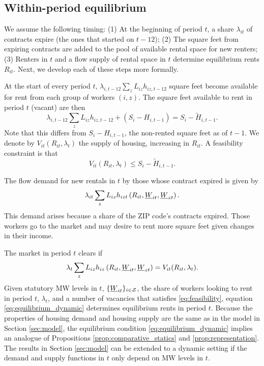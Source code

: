 \subsection*{Within-period equilibrium}

We assume the following timing: 
(1) At the beginning of period $t$, a share $\lambda_{it}$ of contracts 
expire (the ones that started on $t-12$);
(2) The square feet from expiring contracts are added to the pool of available 
rental space for new renters;
(3) Renters in $t$ and a flow supply of rental space in $t$ determine equilibrium 
rents $R_{it}$.
Next, we develop each of these steps more formally.

At the start of every period $t$, $\lambda_{i,t-12} \sum_z L_{iz} h_{iz,t-12}$ 
square feet become available for rent from each group of workers $(i,z)$.
The square feet available to rent in period $t$ (vacant) are then
$$
\lambda_{i,t-12} \sum_z L_{iz} h_{iz,t-12} + (S_i - H_{i,t-1}) 
       = S_i - \tilde H_{i,t-1}.
$$
Note that this differs from $S_i - H_{i,t-1}$, the non-rented square feet as 
of $t-1$.
We denote by $V_{it}(R_{it}, \lambda_t)$ the supply of housing, increasing in 
$R_{it}$.
A feasibility constraint is that 
\begin{equation}\label{eq:feasibility}
    V_{it}(R_{it}, \lambda_t) \leq S_i - \tilde H_{i,t-1} .
\end{equation}

The flow demand for new rentals in $t$ by those whose contract expired is given 
by
$$
\lambda_{it} \sum_z L_{iz} h_{izt} \left(R_{it}, \underline{W}_{it}, \underline{W}_{zt} \right) .
$$
This demand arises because a share of the ZIP code's contracts expired. 
Those workers go to the market and may desire to rent more square feet given 
changes in their income.

The market in period $t$ clears if
\begin{equation}\label{eq:equilibrium_dynamic}
    \lambda_t \sum_z L_{iz} h_{iz} \left(R_{it}, \underline{W}_{it}, \underline{W}_{zt} \right) = 
    V_{it}(R_{it}, \lambda_t) .
\end{equation}
Given statutory MW levels in $t$, $\{\underline{W}_{it}\}_{i\in\mathcal{Z}}$,
the share of workers looking to rent in period $t$, $\lambda_t$, and 
a number of vacancies that satisfies \eqref{eq:feasibility}, 
equation \eqref{eq:equilibrium_dynamic} determines equilibrium rents in 
period $t$.
Because the properties of housing demand and housing supply are the same as in 
the model in Section \ref{sec:model},
the equilibrium condition \eqref{eq:equilibrium_dynamic} implies an analogue of 
Propositions \ref{prop:comparative_statics} and \ref{prop:representation}.
The results in Section \ref{sec:model} can be extended to a dynamic setting if
the demand and supply functions in $t$ only depend on MW levels in $t$.

